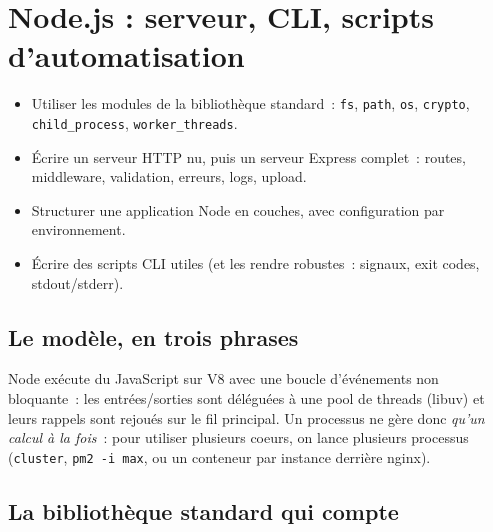 \chapter{Node.js : serveur, CLI, scripts d'automatisation}
\label{ch-node}

\begin{objectif}
\begin{itemize}
  \item Utiliser les modules de la biblioth\`eque standard~: \texttt{fs}, \texttt{path}, \texttt{os},
        \texttt{crypto}, \texttt{child\_process}, \texttt{worker\_threads}.
  \item \'Ecrire un serveur HTTP nu, puis un serveur Express complet~: routes, middleware,
        validation, erreurs, logs, upload.
  \item Structurer une application Node en couches, avec configuration par environnement.
  \item \'Ecrire des scripts CLI utiles (et les rendre robustes~: signaux, exit codes, stdout/stderr).
\end{itemize}
\end{objectif}

\section{Le mod\`ele, en trois phrases}

Node ex\'ecute du JavaScript sur V8 avec une boucle d'\'ev\'enements non bloquante~: les entr\'ees/sorties
sont d\'el\'egu\'ees \`a une pool de threads (libuv) et leurs rappels sont rejou\'es sur le fil principal.
Un processus ne g\`ere donc \emph{qu'un calcul \`a la fois}~: pour utiliser plusieurs coeurs, on lance
plusieurs processus (\verb|cluster|, \verb|pm2 -i max|, ou un conteneur par instance derri\`ere nginx).

\section{La biblioth\`eque standard qui compte}

